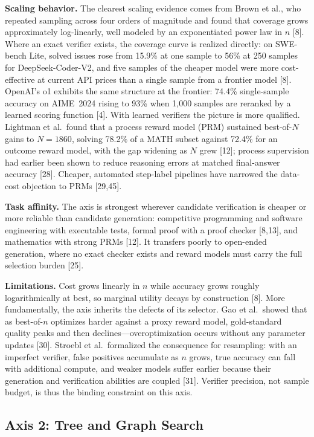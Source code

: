 \documentclass[10pt]{article}
\begin{document}
\textbf{Scaling behavior.} The clearest scaling evidence comes from Brown et al., who repeated sampling across four orders of magnitude and found that coverage grows approximately log-linearly, well modeled by an exponentiated power law in $n$ [8]. Where an exact verifier exists, the coverage curve is realized directly: on SWE-bench Lite, solved issues rose from 15.9\% at one sample to 56\% at 250 samples for DeepSeek-Coder-V2, and five samples of the cheaper model were more cost-effective at current API prices than a single sample from a frontier model [8]. OpenAI's o1 exhibits the same structure at the frontier: 74.4\% single-sample accuracy on AIME~2024 rising to 93\% when 1{,}000 samples are reranked by a learned scoring function [4]. With learned verifiers the picture is more qualified. Lightman et al.\ found that a process reward model (PRM) sustained best-of-$N$ gains to $N{=}1860$, solving 78.2\% of a MATH subset against 72.4\% for an outcome reward model, with the gap widening as $N$ grew [12]; process supervision had earlier been shown to reduce reasoning errors at matched final-answer accuracy [28]. Cheaper, automated step-label pipelines have narrowed the data-cost objection to PRMs [29,45].

\textbf{Task affinity.} The axis is strongest wherever candidate verification is cheaper or more reliable than candidate generation: competitive programming and software engineering with executable tests, formal proof with a proof checker [8,13], and mathematics with strong PRMs [12]. It transfers poorly to open-ended generation, where no exact checker exists and reward models must carry the full selection burden [25].

\textbf{Limitations.} Cost grows linearly in $n$ while accuracy grows roughly logarithmically at best, so marginal utility decays by construction [8]. More fundamentally, the axis inherits the defects of its selector. Gao et al.\ showed that as best-of-$n$ optimizes harder against a proxy reward model, gold-standard quality peaks and then declines---overoptimization occurs without any parameter updates [30]. Stroebl et al.\ formalized the consequence for resampling: with an imperfect verifier, false positives accumulate as $n$ grows, true accuracy can fall with additional compute, and weaker models suffer earlier because their generation and verification abilities are coupled [31]. Verifier precision, not sample budget, is thus the binding constraint on this axis.

\subsection{Axis 2: Tree and Graph Search}
\label{sec:axis2}
\end{document}

